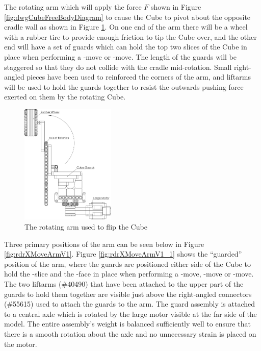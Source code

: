 \documentclass{report}
\newcommand{\legopiece}[1]{(\##1)}
\newcommand{\face}[1]{\uppercase{\texttt{\formatmovesnospace{#1}}}-face}
\newcommand{\move}[1]{\uppercase{\texttt{\formatmovesnospace{#1}}}-move}
\newcommand{\slice}[1]{\uppercase{\texttt{\formatmovesnospace{#1}}}-slice}
\begin{document}
    The rotating arm which will apply the force $F$ shown in Figure \ref{fig:dwgCubeFreeBodyDiagram} to cause the Cube to pivot about the opposite cradle wall as shown in Figure \ref{fig:dwgRotatingArm}. On one end of the arm there will be a wheel with a rubber tire to provide enough friction to tip the Cube over, and the other end will have a set of guards which can hold the top two slices of the Cube in place when performing a \move{D} or \move{d'}. The length of the guards will be staggered so that they do not collide with the cradle mid-rotation. Small right-angled pieces have been used to reinforced the corners of the arm, and liftarms will be used to hold the guards together to resist the outwards pushing force exerted on them by the rotating Cube.
    
    \begin{figure}[H]
    	\centering
   		\includegraphics[width=0.4\textwidth]{Resources/Images/dwgRotatingArm.png}
   		\caption{The rotating arm used to flip the Cube}
   		\label{fig:dwgRotatingArm}
    \end{figure}

	Three primary positions of the arm can be seen below in Figure \ref{fig:rdrXMoveArmV1}. Figure \ref{fig:rdrXMoveArmV1_1} shows the \enquote{guarded} position of the arm, where the guards are positioned either side of the Cube to hold the \slice{l-r} and the \face{U} in place when performing a \move{D}, \move{D'} or \move{D2}. The two liftarms \legopiece{40490} that have been attached to the upper part of the guards to hold them together are visible just above the right-angled connectors \legopiece{55615} used to attach the guards to the arm. The guard assembly is attached to a central axle which is rotated by the large motor visible at the far side of the model. The entire assembly's weight is balanced sufficiently well to ensure that there is a smooth rotation about the axle and no unnecessary strain is placed on the motor.
\end{document}
